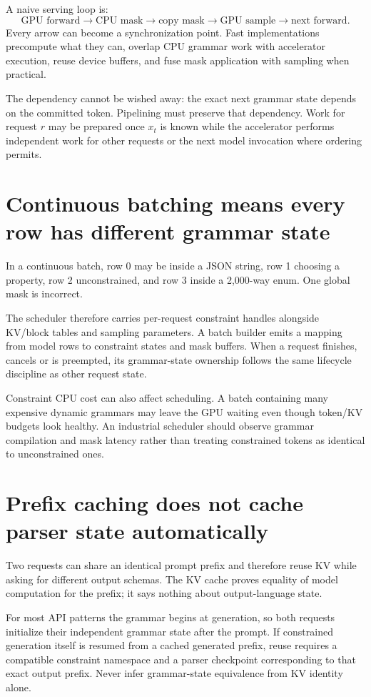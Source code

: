 A naive serving loop is:
\[
\text{GPU forward}\rightarrow\text{CPU mask}\rightarrow\text{copy mask}
\rightarrow\text{GPU sample}\rightarrow\text{next forward}.
\]
Every arrow can become a synchronization point. Fast implementations precompute what
they can, overlap CPU grammar work with accelerator execution, reuse device buffers,
and fuse mask application with sampling when practical.

The dependency cannot be wished away: the exact next grammar state depends on the
committed token. Pipelining must preserve that dependency. Work for request $r$ may be
prepared once $x_t$ is known while the accelerator performs independent work for other
requests or the next model invocation where ordering permits.

\section{Continuous batching means every row has different grammar state}

In a continuous batch, row 0 may be inside a JSON string, row 1 choosing a property,
row 2 unconstrained, and row 3 inside a 2,000-way enum. One global mask is incorrect.

The scheduler therefore carries per-request constraint handles alongside KV/block
tables and sampling parameters. A batch builder emits a mapping from model rows to
constraint states and mask buffers. When a request finishes, cancels or is preempted,
its grammar-state ownership follows the same lifecycle discipline as other request
state.

Constraint CPU cost can also affect scheduling. A batch containing many expensive
dynamic grammars may leave the GPU waiting even though token/KV budgets look healthy.
An industrial scheduler should observe grammar compilation and mask latency rather
than treating constrained tokens as identical to unconstrained ones.

\section{Prefix caching does not cache parser state automatically}

Two requests can share an identical prompt prefix and therefore reuse KV while asking
for different output schemas. The KV cache proves equality of model computation for
the prefix; it says nothing about output-language state.

For most API patterns the grammar begins at generation, so both requests initialize
their independent grammar state after the prompt. If constrained generation itself is
resumed from a cached generated prefix, reuse requires a compatible constraint
namespace and a parser checkpoint corresponding to that exact output prefix. Never
infer grammar-state equivalence from KV identity alone.

